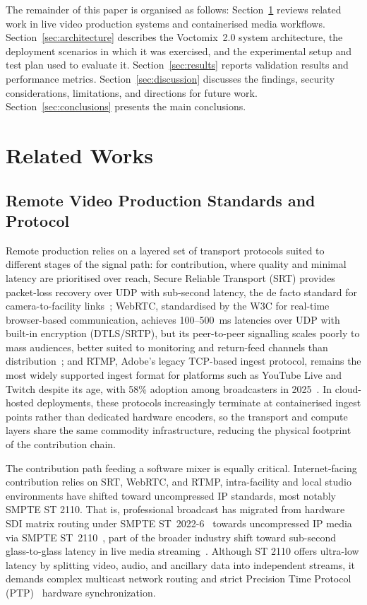 \documentclass[electronics,article,submit,pdftex,moreauthors]{Definitions/mdpi}
\begin{document}
The remainder of this paper is organised as follows: Section~\ref{sec:background} reviews related work in live video production systems and containerised media workflows. Section~\ref{sec:architecture} describes the Voctomix~2.0 system architecture, the deployment scenarios in which it was exercised, and the experimental setup and test plan used to evaluate it. Section~\ref{sec:results} reports validation results and performance metrics. Section~\ref{sec:discussion} discusses the findings, security considerations, limitations, and directions for future work. Section~\ref{sec:conclusions} presents the main conclusions.

\section{Related Works}
\label{sec:background}

\subsection{Remote Video Production Standards and Protocol}

Remote production relies on a layered set of transport protocols suited to different stages of the signal path: for contribution, where quality and minimal latency are prioritised over reach, Secure Reliable Transport (SRT)
provides packet-loss recovery over UDP with sub-second latency, the de facto standard for camera-to-facility links~\cite{sharabayko2024_srt}; WebRTC, standardised by the W3C for real-time browser-based communication, achieves 100--500~ms latencies over UDP with built-in encryption (DTLS/SRTP), but its peer-to-peer signalling scales poorly to mass audiences, better suited to monitoring and return-feed channels than distribution~\cite{w3c_webrtc}; and RTMP, Adobe's legacy TCP-based ingest protocol, remains the most widely supported ingest format for platforms such as YouTube Live and Twitch despite its age, with 58\% adoption among broadcasters in 2025~\cite{haivision_broadcast_report_2025}. In cloud-hosted deployments, these protocols increasingly terminate at containerised ingest points rather than dedicated hardware encoders, so the transport and compute layers share the same commodity infrastructure, reducing the physical footprint of the contribution chain.

The contribution path feeding a software mixer is equally critical. Internet-facing contribution relies on SRT, WebRTC, and RTMP, intra-facility and local studio environments have shifted toward uncompressed IP standards, most notably SMPTE ST 2110. That is, professional broadcast has migrated from hardware SDI matrix routing under SMPTE ST~2022-6~\cite{smpte_st2022_6} towards uncompressed IP media via SMPTE ST~2110~\cite{smpte_st2110_20}, part of the broader industry shift toward sub-second glass-to-glass latency in live media streaming~\cite{bentaleb2023_live_latency}. Although ST 2110 offers ultra-low latency by splitting video, audio, and ancillary data into independent streams, it demands complex multicast network routing and strict  Precision Time Protocol (PTP)~\cite{ieee1588_2019} hardware synchronization.
\end{document}
